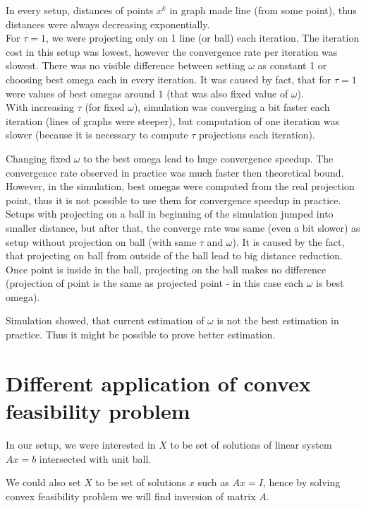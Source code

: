 \documentclass[11pt]{book}
\theoremstyle{definition}
\begin{document}
	In every setup, distances of points $x^k$ in graph made line (from some point), thus distances were always decreasing exponentially.\\
	
	For $\tau=1$, we were projecting only on 1 line (or ball) each iteration. The iteration cost in this setup was lowest, however the convergence rate per iteration was slowest. There was no visible difference between setting $\omega$ as constant 1 or choosing best omega each in every iteration. It was caused by fact, that for $\tau=1$ were values of best omegas around $1$ (that was also fixed value of $\omega$).\\
	
	With increasing $\tau$ (for fixed $\omega$), simulation was converging a bit faster each iteration (lines of graphs were steeper), but computation of one iteration was slower (because it is necessary to compute $\tau$ projections each iteration).
	
	Changing fixed $\omega$ to the best omega lead to huge convergence speedup. The convergence rate observed in practice was much faster then theoretical bound. However, in the simulation, best omegas were computed from the real projection point, thus it is not possible to use them for convergence speedup in practice.\\
	
	Setups with projecting on a ball in beginning of the simulation jumped into smaller distance, but after that, the converge rate was same (even a bit slower) as setup without projection on ball (with same $\tau$ and $\omega$). It is caused by the fact, that projecting on ball from outside of the ball lead to big distance reduction. Once point is inside in the ball, projecting on the ball makes no difference (projection of point is the same as projected point - in this case each $\omega$ is best omega).
	
	Simulation showed, that current estimation of $\omega$ is not the best estimation in practice. Thus it might be possible to prove better estimation.
	
	\section{Different application of convex feasibility problem}
	
	In our setup, we were interested in $X$ to be set of solutions of linear system $Ax=b$ intersected with unit ball.
	
	We could also set $X$ to be set of solutions $x$ such as $Ax=I$, hence by solving convex feasibility problem we will find inversion of matrix $A$.
	
\end{document}
